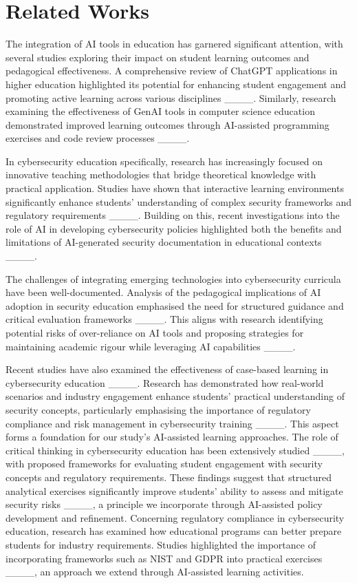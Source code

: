\section{Related Works}
The integration of AI tools in education has garnered significant attention, with several studies exploring their impact on student learning outcomes and pedagogical effectiveness. A comprehensive review of ChatGPT applications in higher education highlighted its potential for enhancing student engagement and promoting active learning across various disciplines ____. Similarly, research examining the effectiveness of GenAI tools in computer science education demonstrated improved learning outcomes through AI-assisted programming exercises and code review processes ____.

In cybersecurity education specifically, research has increasingly focused on innovative teaching methodologies that bridge theoretical knowledge with practical application. Studies have shown that interactive learning environments significantly enhance students' understanding of complex security frameworks and regulatory requirements ____. Building on this, recent investigations into the role of AI in developing cybersecurity policies highlighted both the benefits and limitations of AI-generated security documentation in educational contexts ____.

The challenges of integrating emerging technologies into cybersecurity curricula have been well-documented. Analysis of the pedagogical implications of AI adoption in security education emphasised the need for structured guidance and critical evaluation frameworks ____. This aligns with research identifying potential risks of over-reliance on AI tools and proposing strategies for maintaining academic rigour while leveraging AI capabilities ____.

Recent studies have also examined the effectiveness of case-based learning in cybersecurity education ____. Research has demonstrated how real-world scenarios and industry engagement enhance students' practical understanding of security concepts, particularly emphasising the importance of regulatory compliance and risk management in cybersecurity training ____. This aspect forms a foundation for our study's AI-assisted learning approaches.
The role of critical thinking in cybersecurity education has been extensively studied ____, with proposed frameworks for evaluating student engagement with security concepts and regulatory requirements. These findings suggest that structured analytical exercises significantly improve students' ability to assess and mitigate security risks ____, a principle we incorporate through AI-assisted policy development and refinement.
Concerning regulatory compliance in cybersecurity education, research has examined how educational programs can better prepare students for industry requirements. Studies highlighted the importance of incorporating frameworks such as NIST and GDPR into practical exercises ____, an approach we extend through AI-assisted learning activities.

